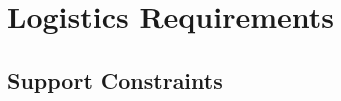 \KNEADSECTIONNEWPAGE
\section{Logistics Requirements}
\label{lab:sec_Logistics}
% 


\KNEADSUBSECTIONNEWPAGE
\subsection{Support Constraints}
\label{lab:ssec_Logistics_SuportConstraints_CAP}






% 


